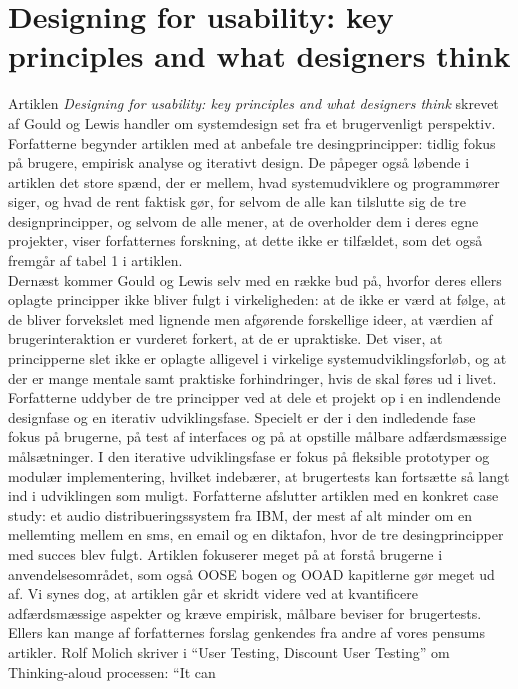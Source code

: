 \documentclass[12pt]{article}   %
\begin{document}
\section{Designing for usability: key principles and what designers think}
Artiklen \emph{Designing for usability: key principles and what designers
think} \cite{usa} skrevet af Gould og Lewis handler om systemdesign set fra et
brugervenligt perspektiv. Forfatterne begynder artiklen med at anbefale tre
desingprincipper: tidlig fokus på brugere, empirisk analyse og iterativt
design. De påpeger også løbende i artiklen det store spænd, der er mellem,
hvad systemudviklere og programmører siger, og hvad de rent faktisk gør, for
selvom de alle kan tilslutte sig de tre designprincipper, og selvom de alle
mener, at de overholder dem i deres egne projekter, viser forfatternes
forskning, at dette ikke er tilfældet, som det også fremgår af tabel 1 i
artiklen. \\
Dernæst kommer Gould og Lewis selv med en række bud på, hvorfor deres ellers
oplagte principper ikke bliver fulgt i virkeligheden: at de ikke er værd at
følge, at de bliver forvekslet med lignende men afgørende forskellige ideer,
at værdien af brugerinteraktion er vurderet forkert, at de er upraktiske. Det
viser, at principperne slet ikke er oplagte alligevel i virkelige
systemudviklingsforløb, og at der er mange mentale samt praktiske
forhindringer, hvis de skal føres ud i livet. \\
Forfatterne uddyber de tre principper ved at dele et projekt op i en
indlendende designfase og en iterativ udviklingsfase. Specielt er der i den
indledende fase fokus på brugerne, på test af interfaces og på at opstille
målbare adfærdsmæssige målsætninger. I den iterative udviklingsfase er fokus
på fleksible prototyper og modulær implementering, hvilket indebærer, at
brugertests kan fortsætte så langt ind i udviklingen som muligt. Forfatterne
afslutter artiklen med en konkret case study: et audio distribueringssystem
fra IBM, der mest af alt minder om en mellemting mellem en sms, en email og en
diktafon, hvor de tre desingprincipper med succes blev fulgt. 
Artiklen fokuserer meget på at forstå brugerne i anvendelsesområdet, som også
OOSE bogen og OOAD kapitlerne gør meget ud af. Vi synes dog, at artiklen går
et skridt videre ved at kvantificere adfærdsmæssige aspekter og kræve
empirisk, målbare beviser for brugertests. Ellers kan mange af forfatternes
forslag genkendes fra andre af vores pensums artikler.  Rolf Molich skriver i
``User Testing, Discount User Testing'' om Thinking-aloud processen: ``It can
\end{document}
